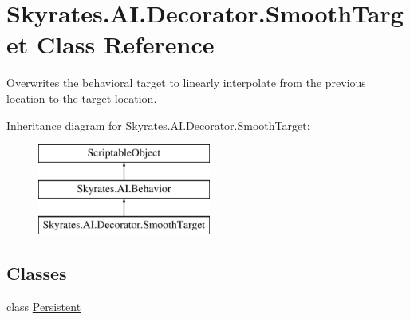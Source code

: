 \hypertarget{class_skyrates_1_1_a_i_1_1_decorator_1_1_smooth_target}{\section{Skyrates.\-A\-I.\-Decorator.\-Smooth\-Target Class Reference}
\label{class_skyrates_1_1_a_i_1_1_decorator_1_1_smooth_target}
}


Overwrites the behavioral target to linearly interpolate from the previous location to the target location.  


Inheritance diagram for Skyrates.\-A\-I.\-Decorator.\-Smooth\-Target\-:\begin{figure}[H]
\begin{center}
\leavevmode
\includegraphics[height=3.000000cm]{class_skyrates_1_1_a_i_1_1_decorator_1_1_smooth_target}
\end{center}
\end{figure}
\subsection*{Classes}
\begin{DoxyCompactItemize}
\item 
class \hyperlink{class_skyrates_1_1_a_i_1_1_decorator_1_1_smooth_target_1_1_persistent}{Persistent}
\end{DoxyCompactItemize}
